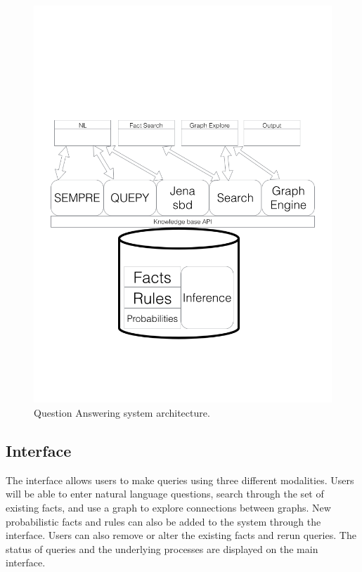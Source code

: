 

\begin{figure}
\includegraphics[width=\columnwidth,clip=true,trim=0cm 4cm 0cm 10cm]{images/qaarchitecture.png}
\caption{Question Answering system architecture.}
\label{fig:qaarchitecture}
\end{figure}


\subsection{Interface}
\label{sec:probqa-interface}

The interface allows users to make queries using three different modalities.
Users will be able to enter natural language questions, search through the set of existing facts, and use a graph to explore connections between graphs.
New probabilistic facts and rules can also be added to the system through the interface.
Users can also remove or alter the existing facts and rerun queries.
The status of queries and the underlying processes are displayed on the main interface.

